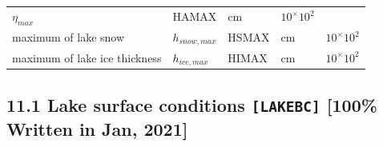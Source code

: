 \begin{longtable}[]{@{}lllll@{}}
\begin{minipage}[t]{0.15\columnwidth}
\(\eta_{max}\)\strut
\end{minipage} & \begin{minipage}[t]{0.09\columnwidth}\raggedright
HAMAX\strut
\end{minipage} & \begin{minipage}[t]{0.14\columnwidth}\raggedright
\(\mathrm{cm}\)\strut
\end{minipage} & \begin{minipage}[t]{0.18\columnwidth}\raggedright
\(10^\times 10^{2}\)\strut
\end{minipage}\tabularnewline
\begin{minipage}[t]{0.30\columnwidth}\raggedright
maximum of lake snow\strut
\end{minipage} & \begin{minipage}[t]{0.15\columnwidth}\raggedright
\(h_{snow,max}\)\strut
\end{minipage} & \begin{minipage}[t]{0.09\columnwidth}\raggedright
HSMAX\strut
\end{minipage} & \begin{minipage}[t]{0.14\columnwidth}\raggedright
\(\mathrm{cm}\)\strut
\end{minipage} & \begin{minipage}[t]{0.18\columnwidth}\raggedright
\(10^\times 10^{2}\)\strut
\end{minipage}\tabularnewline
\begin{minipage}[t]{0.30\columnwidth}\raggedright
maximum of lake ice thickness\strut
\end{minipage} & \begin{minipage}[t]{0.15\columnwidth}\raggedright
\(h_{ice,max}\)\strut
\end{minipage} & \begin{minipage}[t]{0.09\columnwidth}\raggedright
HIMAX\strut
\end{minipage} & \begin{minipage}[t]{0.14\columnwidth}\raggedright
\(\mathrm{cm}\)\strut
\end{minipage} & \begin{minipage}[t]{0.18\columnwidth}\raggedright
\(10^\times 10^{2}\)\strut
\end{minipage}\tabularnewline
\bottomrule
\end{longtable}

\hypertarget{lake-surface-conditions-lakebc-100-written-in-jan-2021}{%
\subsection{\texorpdfstring{11.1 Lake surface conditions
\texttt{{[}LAKEBC{]}} {[}100\% Written in Jan,
2021{]}}{11.1 Lake surface conditions {[}LAKEBC{]} {[}100\% Written in Jan, 2021{]}}}\label{lake-surface-conditions-lakebc-100-written-in-jan-2021}}


